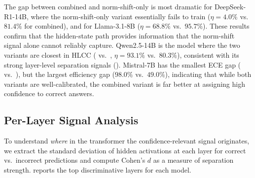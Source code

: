 \documentclass[11pt,a4paper]{article}
\begin{document}
The gap between combined and norm-shift-only is most
dramatic for DeepSeek-R1-14B, where the norm-shift-only variant
essentially fails to train ($\eta = 4.0\%$ vs.\ $81.4\%$ for combined),
and for Llama-3.1-8B ($\eta = 68.8\%$ vs.\ $95.7\%$).  These results
confirm that the hidden-state path provides information that the
norm-shift signal alone cannot reliably capture.
Qwen2.5-14B is the model where the two variants are closest in HLCC
(\qwenLCombinedHLCC{} vs.\ \qwenLNSOHLCC{}, $\eta = 93.1\%$ vs.\
$80.3\%$), consistent with its strong layer-level separation signals
(\Cref{tab:layer-signals}).  Mistral-7B has the smallest ECE gap
(\mistralCombinedECE{} vs.\ \mistralNSOECE{}), but the largest
efficiency gap ($98.0\%$ vs.\ $49.0\%$), indicating that while both
variants are well-calibrated, the combined variant is far better at
assigning high confidence to correct answers.

\subsection{Per-Layer Signal Analysis}
\label{sec:layer-analysis}

To understand \emph{where} in the transformer the confidence-relevant
signal originates, we extract the standard deviation of hidden
activations at each layer for correct vs.\ incorrect predictions and
compute Cohen's $d$ as a measure of separation strength.
 reports the top discriminative layers for each
model.
\end{document}
